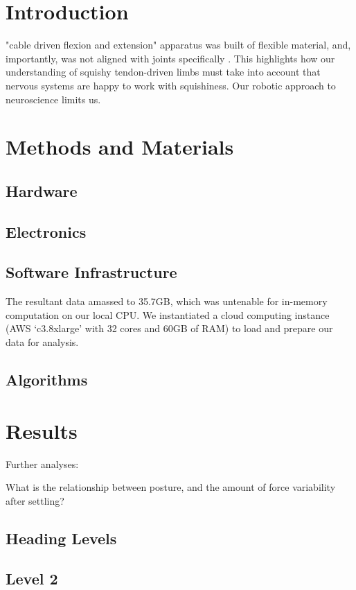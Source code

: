 \documentclass[utf8]{frontiersSCNS} %
\begin{document}
\section{Introduction}

"cable driven flexion and extension" apparatus was built of flexible material, and, importantly, was not aligned with joints specifically \cite{Yi:2018et}. This highlights how our understanding of squishy tendon-driven limbs must take into account that nervous systems are happy to work with squishiness. Our robotic approach to neuroscience limits us.
\section{Methods and Materials}
\subsection{Hardware}
\subsection{Electronics}
\subsection{Software Infrastructure}
The resultant data amassed to 35.7GB, which was untenable for in-memory computation on our local CPU. We instantiated a cloud computing instance (AWS `c3.8xlarge' with 32 cores and 60GB of RAM) to load and prepare our data for analysis.
\subsection{Algorithms}
\section{Results}
Further analyses:

What is the relationship between posture, and the amount of force variability after settling?


\subsection{Heading Levels}


\subsection{Level 2}
\end{document}
